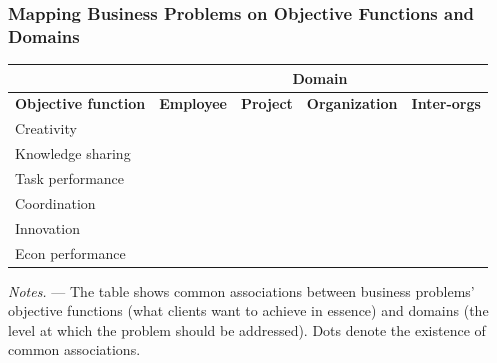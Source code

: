 \documentclass[notes, aspectratio=1610]{beamer}
\begin{document}
\begin{frame}
	\frametitle{Mapping Business Problems on Objective Functions and Domains}
	\begin{table}
		\begin{small}
			\begin{center}
				\begin{tabular}[c]{
					p{3cm}|p{2.1cm}|p{2.1cm}|p{2.1cm}|p{2.1cm}
					}
					\multicolumn{1}{c}{\textbf{}}
					& \multicolumn{4}{c}{\textbf{Domain}}\\
					\hline
					\textbf{Objective function}
					&\multicolumn{1}{c|}{\textbf{Employee}}
					&\multicolumn{1}{c|}{\textbf{Project}}
					&\multicolumn{1}{c|}{\textbf{Organization}}
					&\multicolumn{1}{c}{\textbf{Inter-orgs}}\\
					\hline
					Creativity\dotfill&
					\cellcolor{white!25}\multicolumn{1}{c}{\bullet}& 
					\cellcolor{white!25}\multicolumn{1}{c}{\bullet}&
					&
					\\ 
					Knowledge sharing\dotfill&
					\cellcolor{white!25}\multicolumn{1}{c}{\bullet}&
					\cellcolor{white!25}\multicolumn{1}{c}{\bullet}&
					&
					\\
					Task performance\dotfill&
					\cellcolor{white!25}\multicolumn{1}{c}{\bullet}&
					\cellcolor{white!25}\multicolumn{1}{c}{\bullet}&
					&
					\\ 
					Coordination\dotfill&
					\cellcolor{white!25}\multicolumn{1}{c}{\bullet}&
					\cellcolor{white!25}\multicolumn{1}{c}{\bullet}&
					\cellcolor{white!25}\multicolumn{1}{c}{\bullet}&
					\cellcolor{white!25}\multicolumn{1}{c}{\bullet}\\
					Innovation\dotfill&
					\cellcolor{white!25}\multicolumn{1}{c}{\bullet}&
					\cellcolor{white!25}\multicolumn{1}{c}{\bullet}&
					\cellcolor{white!25}\multicolumn{1}{c}{\bullet}&
					\cellcolor{white!25}\multicolumn{1}{c}{\bullet}\\ 
				        Econ performance\dotfill&
					&
					&\cellcolor{white!25}\multicolumn{1}{c}{\bullet}
					&
					\\
				\end{tabular}
			\end{center}
		\end{small}
	\end{table}
	\textit{Notes.} --- The table shows common associations between business problems' 
	objective functions (what clients want to achieve in essence) 
	and domains (the level at which the problem should be addressed). Dots 
	denote the existence of common associations.
\end{frame}
\end{document}
